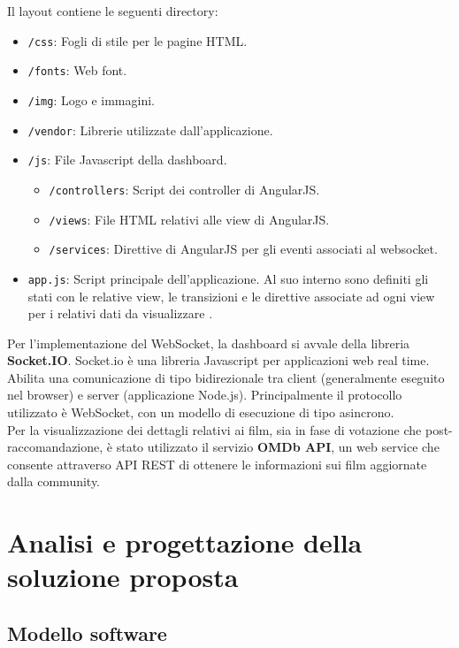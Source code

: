 \documentclass[12pt]{article}
\begin{document}
Il layout contiene le seguenti directory: 
\begin{itemize}
	\item \texttt{/css}: Fogli di stile per le pagine HTML.
	\item \texttt{/fonts}: Web font.
	\item \texttt{/img}: Logo e immagini.
	\item \texttt{/vendor}: Librerie utilizzate dall'applicazione.
	\item \texttt{/js}: File Javascript della dashboard.
	\begin{itemize}
		\item \texttt{/controllers}: Script dei controller di AngularJS.
		\item \texttt{/views}: File HTML relativi alle view di AngularJS.
		\item \texttt{/services}: Direttive di AngularJS per gli eventi associati al websocket.
	\end{itemize}
	\item \texttt{app.js}: Script principale dell'applicazione. Al suo interno sono definiti gli stati con le relative view, le transizioni e le direttive associate ad ogni view per i relativi dati da visualizzare \cite{angularjs}.
\end{itemize}

Per l'implementazione del WebSocket, la dashboard si avvale della libreria \textbf{Socket.IO}. Socket.io è una libreria Javascript per applicazioni web real time. Abilita una comunicazione di tipo bidirezionale tra client (generalmente eseguito nel browser) e server (applicazione Node.js). Principalmente il protocollo utilizzato è WebSocket, con un modello di esecuzione di tipo asincrono. \\

Per la visualizzazione dei dettagli relativi ai film, sia in fase di votazione che post-raccomandazione, è stato utilizzato il servizio \textbf{OMDb API}, un web service che consente attraverso API REST di ottenere le informazioni sui film aggiornate dalla community.

\section{Analisi e progettazione della soluzione proposta}

\subsection {Modello software}
\end{document}
